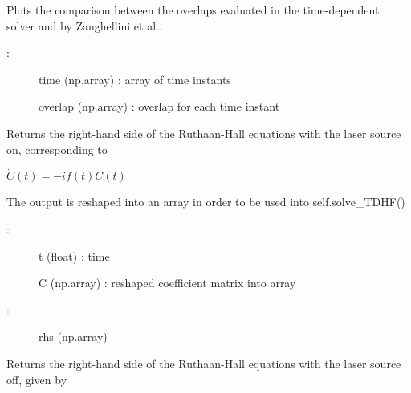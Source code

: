 \documentclass[letterpaper,10pt,english]{sphinxmanual}
\begin{document}
\begin{fulllineitems}

\begin{fulllineitems}
\label{\detokenize{index:do.GHF.plot_overlap}}
Plots the comparison between the overlaps evaluated in the time-dependent solver and by Zanghellini et al..
\begin{description}
\item[{:}] \leavevmode
time (np.array) : array of time instants

overlap (np.array) : overlap for each time instant

\end{description}

\end{fulllineitems}


\begin{fulllineitems}
\label{\detokenize{index:do.GHF.rhsf}}
Returns the right-hand side of the Ruthaan-Hall equations with the laser source on, corresponding to

\(\dot{C}(t) = -i f(t)C(t)\)

The output is reshaped into an array in order to be used into self.solve\_TDHF()
\begin{description}
\item[{:}] \leavevmode
t (float) : time

C (np.array) : reshaped coefficient matrix into array

\item[{:}] \leavevmode
rhs (np.array)

\end{description}

\end{fulllineitems}


\begin{fulllineitems}
\label{\detokenize{index:do.GHF.rhsf_OFF}}
Returns the right-hand side of the Ruthaan-Hall equations with the laser source off, given by


\end{fulllineitems}
\end{fulllineitems}
\end{document}
